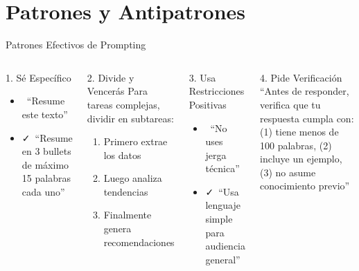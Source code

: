 \documentclass[aspectratio=169]{beamer}
\begin{document}
\section{Patrones y Antipatrones}

\begin{frame}{Patrones Efectivos de Prompting}
    \begin{columns}[t]
        \begin{block}{1. Sé Específico}
            \begin{itemize}
                \item \faTimes\ ``Resume este texto''
                \item \faCheck\ ``Resume en 3 bullets de máximo 15 palabras cada uno''
            \end{itemize}
        \end{block}
        
        \begin{block}{2. Divide y Vencerás}
            Para tareas complejas, dividir en subtareas:
            \begin{enumerate}
                \item Primero extrae los datos
                \item Luego analiza tendencias
                \item Finalmente genera recomendaciones
            \end{enumerate}
        \end{block}
        
        \begin{block}{3. Usa Restricciones Positivas}
            \begin{itemize}
                \item \faTimes\ ``No uses jerga técnica''
                \item \faCheck\ ``Usa lenguaje simple para audiencia general''
            \end{itemize}
        \end{block}
        
        \begin{block}{4. Pide Verificación}
            ``Antes de responder, verifica que tu respuesta cumpla con: (1) tiene menos de 100 palabras, (2) incluye un ejemplo, (3) no asume conocimiento previo''
        \end{block}
    \end{columns}
\end{frame}
\end{document}
